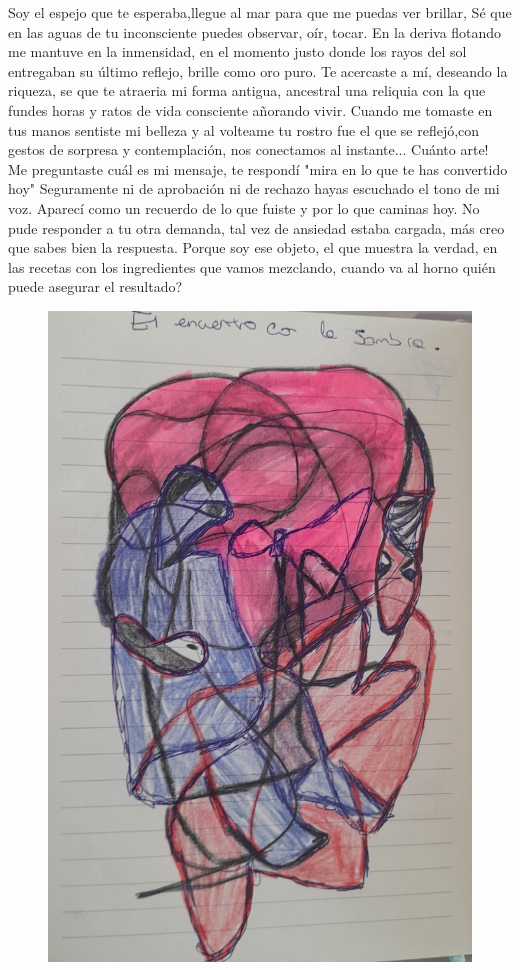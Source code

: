 \documentclass[12pt, a4paper, twoside]{book} %
\begin{document}
Soy el espejo que te esperaba,llegue al mar para que me puedas ver brillar, Sé que en las aguas de tu inconsciente puedes observar, oír, tocar.
En la deriva flotando me mantuve en la inmensidad, en el momento justo donde los rayos del sol entregaban su último reflejo, brille como oro puro.
Te acercaste a mí, deseando la riqueza, se que te atraeria mi forma antigua, ancestral una reliquia con la que fundes horas y ratos de vida consciente añorando vivir.
Cuando me tomaste en tus manos sentiste mi belleza y al volteame tu rostro fue el que se reflejó,con gestos de sorpresa y contemplación, nos conectamos al instante... Cuánto arte!
Me preguntaste cuál es mi mensaje, te respondí "mira en lo que te has convertido hoy"
Seguramente ni de aprobación ni de rechazo hayas escuchado el tono de mi voz.
Aparecí como un recuerdo de lo que fuiste y por lo que caminas hoy.
No pude responder a tu otra demanda, tal vez de ansiedad estaba cargada, más creo que sabes bien la respuesta.
Porque soy ese objeto, el que muestra la verdad, en las recetas con los ingredientes que vamos mezclando, cuando va al horno  quién puede asegurar el resultado?

\begin{figure}[H]
	\centering
	\includegraphics[width=\textwidth]{./images/1f81324df25232.jpg}
\end{figure}
\end{document}
